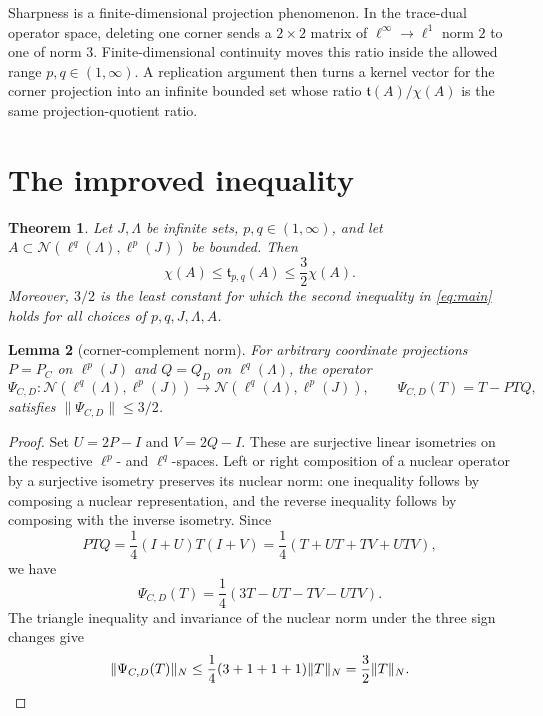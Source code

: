 \documentclass[11pt]{article}
\newtheorem{theorem}{Theorem}
\newtheorem{lemma}[theorem]{Lemma}
\newcommand{\Nuc}{\mathcal N}
\newcommand{\Tail}{\mathfrak t}
\begin{document}
Sharpness is a finite-dimensional projection phenomenon.  In the trace-dual
operator space, deleting one corner sends a \(2\times2\) matrix of
\(\ell^\infty\!\to\ell^1\) norm \(2\) to one of norm \(3\).  Finite-dimensional
continuity moves this ratio inside the allowed range \(p,q\in(1,\infty)\).
A replication argument then turns a kernel vector for the corner projection
into an infinite bounded set whose ratio \(\Tail(A)/\chi(A)\) is the same
projection-quotient ratio.

\section{The improved inequality}

\begin{theorem}\label{thm:main}
Let \(J,\Lambda\) be infinite sets, \(p,q\in(1,\infty)\), and let
\(A\subset \Nuc(\ell^q(\Lambda),\ell^p(J))\) be bounded.  Then
\begin{equation}\label{eq:main}
 \chi(A)\le \Tail_{p,q}(A)\le \frac32\chi(A).
\end{equation}
Moreover, \(3/2\) is the least constant for which the second inequality in
\eqref{eq:main} holds for all choices of \(p,q,J,\Lambda,A\).
\end{theorem}

\begin{lemma}[corner-complement norm]\label{lem:corner}
For arbitrary coordinate projections \(P=P_C\) on \(\ell^p(J)\) and
\(Q=Q_D\) on \(\ell^q(\Lambda)\), the operator
\[
 \Psi_{C,D}:\Nuc(\ell^q(\Lambda),\ell^p(J))\longrightarrow
 \Nuc(\ell^q(\Lambda),\ell^p(J)),\qquad
 \Psi_{C,D}(T)=T-PTQ,
\]
satisfies \(\|\Psi_{C,D}\|\le 3/2\).
\end{lemma}

\begin{proof}
Set \(U=2P-I\) and \(V=2Q-I\).  These are surjective linear isometries on
the respective \(\ell^p\)- and \(\ell^q\)-spaces.  Left or right composition
of a nuclear operator by a surjective isometry preserves its nuclear norm:
one inequality follows by composing a nuclear representation, and the reverse
inequality follows by composing with the inverse isometry.  Since
\[
 PTQ=\frac14(I+U)T(I+V)
     =\frac14(T+UT+TV+UTV),
\]
we have
\[
 \Psi_{C,D}(T)=\frac14(3T-UT-TV-UTV).
\]
The triangle inequality and invariance of the nuclear norm under the three
sign changes give
\[
 \|\Psi_{C,D}(T)\|_N
 \le \frac14(3+1+1+1)\|T\|_N
 =\frac32\|T\|_N. \qedhere
\]
\end{proof}
\end{document}
